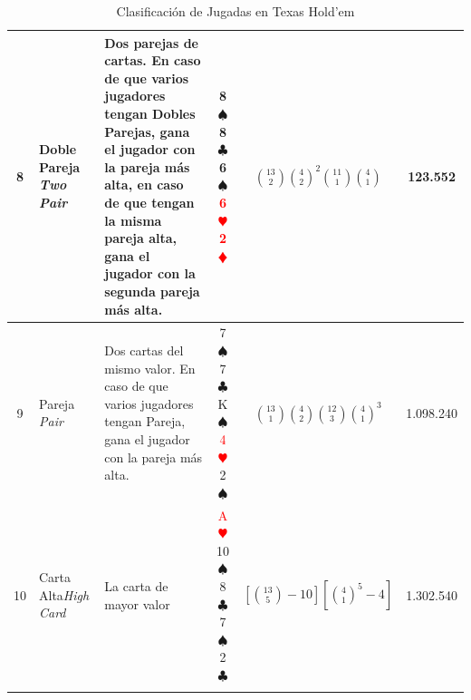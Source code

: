 \begin{longtable}[c]{|c|m{4em}|m{8em}|c|c|c|}
\hline
8 & Doble Pareja \textit{Two Pair}&Dos parejas de cartas. En caso de que varios jugadores tengan Dobles Parejas, gana el jugador con la pareja más alta, en caso de que tengan la misma pareja alta, gana el jugador con la segunda pareja más alta. & 8$\spadesuit$8$\clubsuit$6$\spadesuit$\textcolor{red}{6$\varheartsuit$2$\vardiamondsuit$} & $\binom{13}{2}\binom{4}{2}^2\binom{11}{1}\binom{4}{1}$ & 123.552 \\
\hline
9 & Pareja \textit{Pair}&Dos cartas del mismo valor. En caso de que varios jugadores tengan Pareja, gana el jugador con la pareja más alta.  & 7$\spadesuit$7$\clubsuit$K$\spadesuit$\textcolor{red}{4$\varheartsuit$}2$\spadesuit$  & $\binom{13}{1}\binom{4}{2}\binom{12}{3}\binom{4}{1}^3$ & 1.098.240 \\
\hline
10 & Carta Alta\textit{High Card}&La carta de mayor valor &\textcolor{red}{A$\varheartsuit$}10$\spadesuit$8$\clubsuit$7$\spadesuit$2$\clubsuit$ & $[\binom{13}{5}-10][\binom{4}{1}^5-4]$ & 1.302.540 \\
\hline
\caption{Clasificación de Jugadas en Texas Hold'em}
\label{tab:jugadas}
\end{longtable}


